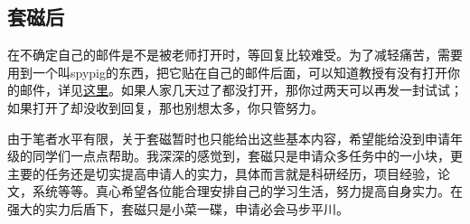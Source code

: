 \subsection{套磁后}
在不确定自己的邮件是不是被老师打开时，等回复比较难受。为了减轻痛苦，需要用到一个叫spypig的东西，把它贴在自己的邮件后面，可以知道教授有没有打开你的邮件，详见\href{http://www.spypig.com/}{这里}。如果人家几天过了都没打开，那你过两天可以再发一封试试；如果打开了却没收到回复，那也别想太多，你只管努力。\par
由于笔者水平有限，关于套磁暂时也只能给出这些基本内容，希望能给没到申请年级的同学们一点点帮助。我深深的感觉到，套磁只是申请众多任务中的一小块，更主要的任务还是切实提高申请人的实力，具体而言就是科研经历，项目经验，论文，系统等等。真心希望各位能合理安排自己的学习生活，努力提高自身实力。在强大的实力后盾下，套磁只是小菜一碟，申请必会马步平川。



